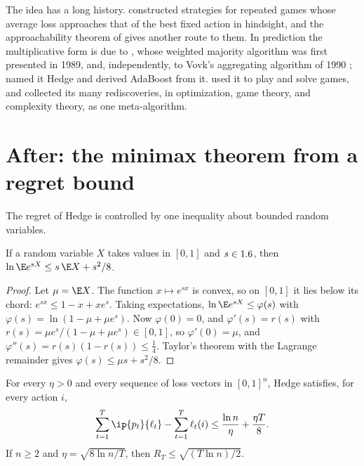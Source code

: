 \begin{refsection}
The idea has a long history. \textcite{Hannan1957} constructed strategies for repeated games whose average loss approaches that of the best fixed action in hindsight, and the approachability theorem of \textcite{Blackwell1956} gives another route to them. In prediction the multiplicative form is due to \textcite{LittlestoneWarmuth1994}, whose weighted majority algorithm was first presented in 1989, and, independently, to Vovk's aggregating algorithm of 1990 \parencite[see][]{CesaBianchiLugosi2006}; \textcite{FreundSchapire1997} named it Hedge and derived AdaBoost from it. \textcite{FreundSchapire1999} used it to play and solve games, and \textcite{AroraHazanKale2012} collected its many rediscoveries, in optimization, game theory, and complexity theory, as one meta-algorithm.

\section{After: the minimax theorem from a regret bound}\label{sec:regret:minimax}

The regret of Hedge is controlled by one inequality about bounded random variables.

\begin{lemma}\label{lem:regret:hoeffding}
If a random variable $X$ takes values in $[0,1]$ and $s\in1.6$, then $\ln\E e^{sX}\le s\,\E X+s^2/8$.
\end{lemma}

\begin{proof}
Let $\mu=\E X$. The function $x\mapsto e^{sx}$ is convex, so on $[0,1]$ it lies below its chord: $e^{sx}\le1-x+xe^s$. Taking expectations, $\ln\E e^{sX}\le\varphi(s)$ with $\varphi(s)=\ln(1-\mu+\mu e^s)$. Now $\varphi(0)=0$, and $\varphi'(s)=r(s)$ with $r(s)=\mu e^s/(1-\mu+\mu e^s)\in[0,1]$, so $\varphi'(0)=\mu$, and $\varphi''(s)=r(s)(1-r(s))\le\frac14$. Taylor's theorem with the Lagrange remainder gives $\varphi(s)\le\mu s+s^2/8$.
\end{proof}

\begin{theorem}\label{thm:regret:hedge}
For every $\eta>0$ and every sequence of loss vectors in $[0,1]^n$, Hedge satisfies, for every action $i$,
\begin{equation}\label{eq:regret:hedge}
\sum_{t=1}^T\ip{p_t}{\ell_t}-\sum_{t=1}^T\ell_t(i)\le\frac{\ln n}{\eta}+\frac{\eta T}8 .
\end{equation}
If $n\ge2$ and $\eta=\sqrt{8\ln n/T}$, then $R_T\le\sqrt{(T\ln n)/2}$.
\end{theorem}


\end{refsection}
